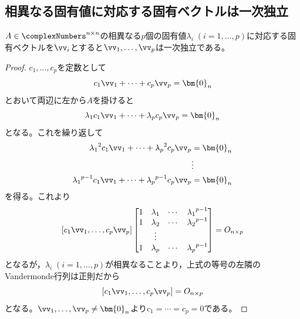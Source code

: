         \subsection{相異なる固有値に対応する固有ベクトルは一次独立}
            \label{相異なる固有値に対応する固有ベクトルは一次独立}
            \begin{shadebox}
                $A\in\complexNumbers^{n\times n}$の相異なる$p$個の固有値$\lambda_i\;(i=1,\dotsc,p)$に対応する固有ベクトルを$\vv_i$とすると$\vv_1,\dotsc,\vv_p$は一次独立である。
            \end{shadebox}
            \begin{proof}
                $c_1,\dotsc,c_p$を定数として
                \[c_1\vv_1 + \dotsb + c_p\vv_p = \bm{0}_n\]
                とおいて両辺に左から$A$を掛けると
                \[\lambda_1 c_1\vv_1 + \dotsb + \lambda_p c_p\vv_p = \bm{0}_n\]
                となる。これを繰り返して
                \begin{align*}
                    {\lambda_1}^2 c_1\vv_1 + \dotsb + {\lambda_p}^2 c_p\vv_p &= \bm{0}_n \\
                    & \vdots \\
                    {\lambda_1}^{p-1} c_1\vv_1 + \dotsb + {\lambda_p}^{p-1} c_p\vv_p &= \bm{0}_n
                \end{align*}
                を得る。これより
                \[
                    [c_1\vv_1,\dotsc,c_p\vv_p]
                    \begin{bmatrix}
                        1 & \lambda_1 & \cdots & {\lambda_1}^{p-1} \\
                        1 & \lambda_2 & \cdots & {\lambda_2}^{p-1} \\
                        & \vdots & \\
                        1 & \lambda_p & \cdots & {\lambda_p}^{p-1}
                    \end{bmatrix}
                    = O_{n\times p}
                \]
                となるが，$\lambda_i\;(i=1,\dotsc,p)$が相異なることより，上式の等号の左隣のVandermonde行列は正則だから
                \[ [c_1\vv_1,\dotsc,c_p\vv_p] = O_{n\times p} \]
                となる。$\vv_1,\dotsc,\vv_p\neq\bm{0}_n$より$c_1=\dotsb=c_p=0$である。
            \end{proof}
